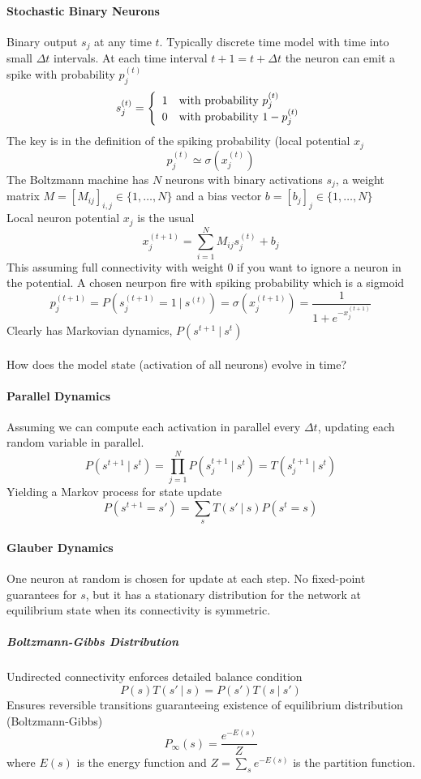 \documentclass[10pt]{report}
\begin{document}
\paragraph{Stochastic Binary Neurons} Binary output $s_j$ at any time $t$. Typically discrete time model with time into small $\Delta t$ intervals. At each time interval $t+1 = t+\Delta t$ the neuron can emit a spike with probability $p_j^{(t)}$ $$s_j^{(t)} = \left\{\begin{array}{c l}
1&\hbox{with probability }p_j^{(t)}\\
0&\hbox{with probability }1-p_j^{(t)}
\end{array}\right.$$
The key is in the definition of the spiking probability (local potential $x_j$ $$p_j^{(t)} \simeq \sigma(x_j^{(t)})$$
The Boltzmann machine has $N$ neurons with binary activations $s_j$, a weight matrix $M = [M_{ij}]_{i,j} \in \{1,\ldots,N\}$ and a bias vector $b = [b_j]_j\in\{1,\ldots,N\}$\\
Local neuron potential $x_j$ is the usual $$x_j^{(t+1)} = \sum_{i=1}^N M_{ij}s_j^{(t)} +b_j$$
This assuming full connectivity with weight $0$ if you want to ignore a neuron in the potential. A chosen neurpon fire with spiking probability which is a sigmoid $$p_j^{(t+1)} = P(s_j^{(t+1)} = 1\:|\:s^{(t)}) = \sigma(x_j^{(t+1)}) = \frac{1}{1+e^{-x_j^{(t+1)}}}$$
Clearly has Markovian dynamics, $P(s^{t+1}\:|\:s^t)$\\\\
How does the model state (activation of all neurons) evolve in time?
\paragraph{Parallel Dynamics} Assuming we can compute each activation in parallel every $\Delta t$, updating each random variable in parallel. $$P(s^{t+1}\:|\:s^t) = \prod_{j=1}^N P(s_j^{t+1}\:|\:s^t) = T(s_j^{t+1}\:|\:s^t)$$
Yielding a Markov process for state update
$$P(s^{t+1} = s') = \sum_s T(s'\:|\:s)P(s^t = s)$$
\paragraph{Glauber Dynamics} One neuron at random is chosen for update at each step. No fixed-point guarantees for $s$, but it has a stationary distribution for the network at equilibrium state when its connectivity is symmetric.
\subparagraph{Boltzmann-Gibbs Distribution} Undirected connectivity enforces detailed balance condition $$P(s)T(s'\:|\:s) = P(s')T(s\:|\:s')$$
Ensures reversible transitions guaranteeing existence of equilibrium distribution (Boltzmann-Gibbs) $$P_\infty(s) = \frac{e^{-E(s)}}{Z}$$
where $E(s)$ is the energy function and $Z = \sum_se^{-E(s)}$ is the partition function.
\end{document}
